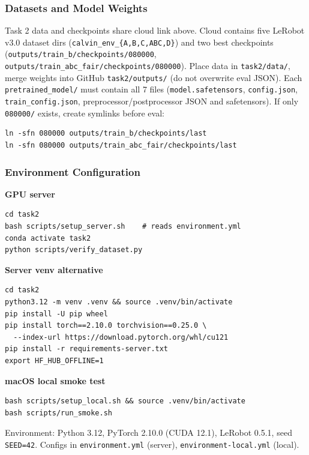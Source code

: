 \documentclass[10pt,twocolumn,letterpaper]{article}
\begin{document}
\subsubsection{Datasets and Model Weights}

Task 2 data and checkpoints share cloud link above. Cloud contains five LeRobot v3.0 dataset dirs (\texttt{calvin\_env\_\{A,B,C,ABC,D\}}) and two best checkpoints (\texttt{outputs/train\_b/checkpoints/080000}, \texttt{outputs/train\_abc\_fair/checkpoints/080000}). Place data in \texttt{task2/data/}, merge weights into GitHub \texttt{task2/outputs/} (do not overwrite eval JSON). Each \texttt{pretrained\_model/} must contain all 7 files (\texttt{model.safetensors}, \texttt{config.json}, \texttt{train\_config.json}, preprocessor/postprocessor JSON and safetensors). If only \texttt{080000/} exists, create symlinks before eval:
\begin{lstlisting}
ln -sfn 080000 outputs/train_b/checkpoints/last
ln -sfn 080000 outputs/train_abc_fair/checkpoints/last
\end{lstlisting}

\subsubsection{Environment Configuration}

\textbf{GPU server}
\begin{lstlisting}
cd task2
bash scripts/setup_server.sh    # reads environment.yml
conda activate task2
python scripts/verify_dataset.py
\end{lstlisting}

\textbf{Server venv alternative}
\begin{lstlisting}
cd task2
python3.12 -m venv .venv && source .venv/bin/activate
pip install -U pip wheel
pip install torch==2.10.0 torchvision==0.25.0 \
  --index-url https://download.pytorch.org/whl/cu121
pip install -r requirements-server.txt
export HF_HUB_OFFLINE=1
\end{lstlisting}

\textbf{macOS local smoke test}
\begin{lstlisting}
bash scripts/setup_local.sh && source .venv/bin/activate
bash scripts/run_smoke.sh
\end{lstlisting}

Environment: Python 3.12, PyTorch 2.10.0 (CUDA 12.1), LeRobot 0.5.1, seed \texttt{SEED=42}. Configs in \texttt{environment.yml} (server), \texttt{environment-local.yml} (local).
\end{document}
